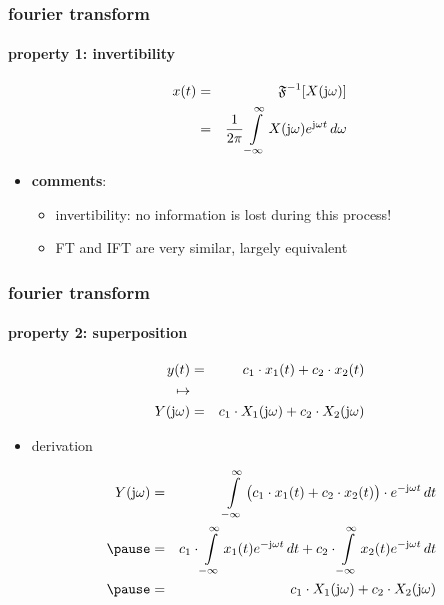 	\begin{frame}\frametitle{fourier transform}\framesubtitle{property 1: invertibility}
		\begin{eqnarray*}\label{eq:ift}
			x(t) &=& \mathfrak{F}^{-1}[X(\mathrm{j}\omega)]\nonumber\\
			 &=& \frac{1}{2\pi}\int\limits_{-\infty}^{\infty} X(\mathrm{j}\omega) {e}^{\mathrm{j}\omega t}\, d\omega 
		\end{eqnarray*}
        \bigskip
 
        \begin{itemize}
            \pause
            \item   \textbf{comments}:
                \begin{itemize}
                    \item   invertibility: no information is lost during this process!
                    \item   FT and IFT are very similar, largely equivalent
                \end{itemize}
        \end{itemize}
        

	\end{frame}	

	\begin{frame}\frametitle{fourier transform}\framesubtitle{property 2: superposition}
		\begin{eqnarray}
			y(t) &=& c_1\cdot x_1(t) + c_2\cdot x_2(t)\nonumber\\
			\mapsto&&\nonumber\\
			Y(\mathrm{j}\omega) &=& c_1\cdot X_1(\mathrm{j}\omega) + c_2\cdot X_2(\mathrm{j}\omega)\nonumber
		\end{eqnarray}
		\pause
		\begin{itemize}
			\item[]	derivation
					\begin{footnotesize}
						\begin{eqnarray}
							Y(\jom) &=& \int\limits_{-\infty}^{\infty} {\big(c_1\cdot x_1(t) + c_2\cdot x_2(t)\big)\cdot \e^{-\jom t}\, dt}\nonumber\\
							\pause
							&=& c_1\cdot \int\limits_{-\infty}^{\infty} {x_1(t)  \e^{-\jom t}\, dt} + c_2\cdot \int\limits_{-\infty}^{\infty} {x_2(t) \e^{-\jom t}\, dt}\nonumber\\
							\pause
							&=& c_1\cdot X_1(\jom) + c_2\cdot X_2(\jom) 
						\end{eqnarray}
					\end{footnotesize}
		\end{itemize}
	\end{frame}	

